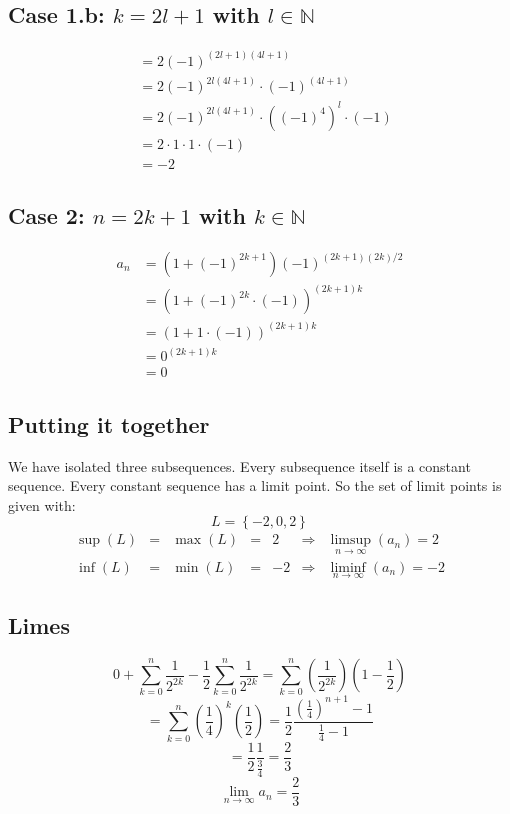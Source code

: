 \documentclass[a4paper]{article}
\theoremstyle{definition}
\newcommand\set[1]{\left\{#1\right\}}
\begin{document}
\subsection{Case 1.b: $k = 2l + 1$ with $l \in \mathbb N$}
%
\begin{align*}
    &= 2 (-1)^{(2l + 1)(4l + 1)} \\
    &= 2 (-1)^{2l(4l + 1)} \cdot \left(-1\right)^{(4l + 1)} \\
    &= 2 (-1)^{2l(4l + 1)} \cdot \left((-1)^4\right)^l \cdot (-1) \\
    &= 2 \cdot 1 \cdot 1 \cdot (-1) \\
    &= -2
\end{align*}

\subsection{Case 2: $n = 2k + 1$ with $k \in \mathbb N$}
%
\begin{align*}
  a_n &= \left(1 + (-1)^{2k + 1}\right) (-1)^{(2k + 1)(2k)/2} \\
      &= \left(1 + (-1)^{2k} \cdot (-1)\right)^{(2k+1) k} \\
      &= \left(1 + 1\cdot(-1)\right)^{(2k + 1)k} \\
      &= 0^{(2k+1) k} \\
      &= 0
\end{align*}

\subsection{Putting it together}
%
We have isolated three subsequences. Every subsequence itself is a constant sequence.
Every constant sequence has a limit point. So the set of limit points is given with:
\[ L = \set{-2, 0, 2} \]
\[
  \begin{array}{rclcccccc}
    \sup(L) & = & \max(L) & = & 2  & \Rightarrow & \limsup_{n\to\infty}(a_n) = 2 \\
    \inf(L) & = & \min(L) & = & -2 & \Rightarrow & \liminf_{n\to\infty}(a_n) = -2
  \end{array}
\]

\subsection{Limes}
%
\[
  0 + \sum_{k=0}^n \frac{1}{2^{2k}} - \frac12 \sum_{k=0}^n \frac{1}{2^{2k}}
  = \sum_{k=0}^n \left(\frac{1}{2^{2k}}\right) \left(1 - \frac12\right)
\] \[
  = \sum_{k=0}^n \left(\frac14\right)^k \left(\frac12\right) = \frac12 \frac{\left(\frac14\right)^{n+1}-1}{\frac14 - 1}
\] \[
  = \frac12 \frac1{\frac34} = \frac23
\] \[
  \lim_{n\to\infty} a_n = \frac23
\]
\end{document}
